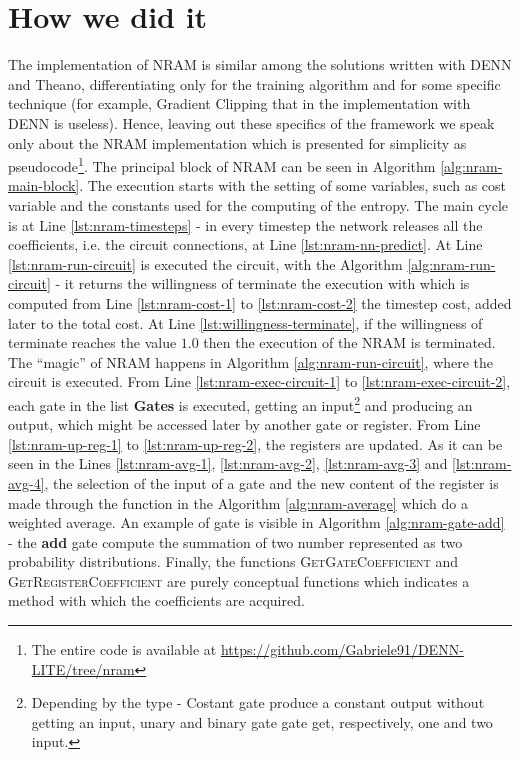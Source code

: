 \section{How we did it}
The implementation of NRAM is similar among the solutions written with DENN and Theano, differentiating only for the training algorithm and for some specific technique (for example, Gradient Clipping that in the implementation with DENN is useless). Hence, leaving out these specifics of the framework we speak only about the NRAM implementation which is presented for simplicity as pseudocode\footnote{The entire code is available at \href{https://github.com/Gabriele91/DENN-LITE/tree/nram}{https://github.com/Gabriele91/DENN-LITE/tree/nram}}.\newline
The principal block of NRAM can be seen in Algorithm \ref{alg:nram-main-block}. The execution starts with the setting of some variables, such as cost variable and the constants used for the computing of the entropy. The main cycle is at Line \ref{lst:nram-timesteps} - in every timestep the network releases all the coefficients, i.e. the circuit connections, at Line \ref{lst:nram-nn-predict}. At Line \ref{lst:nram-run-circuit} is executed the circuit, with the Algorithm \ref{alg:nram-run-circuit} - it returns the willingness of terminate the execution with which is computed from Line \ref{lst:nram-cost-1} to \ref{lst:nram-cost-2} the timestep cost, added later to the total cost. At Line \ref{lst:willingness-terminate}, if the willingness of terminate reaches the value $1.0$ then the execution of the NRAM is terminated. The ``magic'' of NRAM happens in Algorithm \ref{alg:nram-run-circuit}, where the circuit is executed. From Line \ref{lst:nram-exec-circuit-1} to \ref{lst:nram-exec-circuit-2}, each gate in the list \textbf{Gates} is executed, getting an input\footnote{Depending by the type - Costant gate produce a constant output without getting an input, unary and binary gate gate get, respectively, one and two input.} and producing an output, which might be accessed later by another gate or register. From Line \ref{lst:nram-up-reg-1} to \ref{lst:nram-up-reg-2}, the registers are updated. As it can be seen in the Lines \ref{lst:nram-avg-1}, \ref{lst:nram-avg-2}, \ref{lst:nram-avg-3} and \ref{lst:nram-avg-4}, the selection of the input of a gate and the new content of the register is made through the function in the Algorithm \ref{alg:nram-average} which do a weighted average. An example of gate is visible in Algorithm \ref{alg:nram-gate-add} - the \textbf{add} gate compute the summation of two number represented as two probability distributions. Finally, the functions \textsc{GetGateCoefficient} and \textsc{GetRegisterCoefficient} are purely conceptual functions which indicates a method with which the coefficients are acquired.\newline\newline
